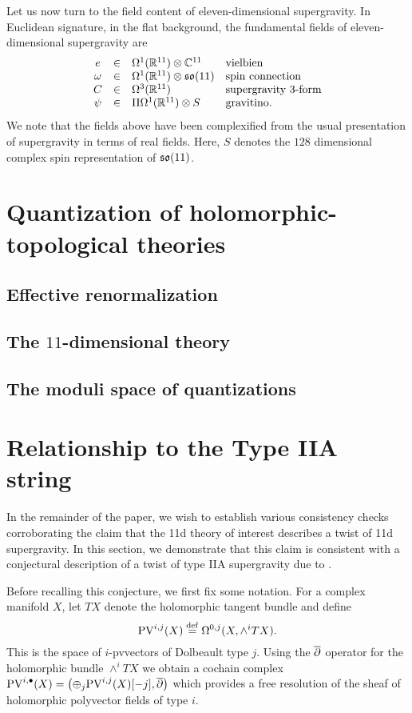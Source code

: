 \documentclass[11pt]{amsart}
\def\pv{{\rm PV}}
\begin{document}
Let us now turn to the field content of eleven-dimensional supergravity.
In Euclidean signature, in the flat background, the fundamental fields of eleven-dimensional supergravity are
\[
  \begin{array}{ccll}
    e & \in & \Omega^1(\mathbb R^{11}) \otimes \mathbb C^{11} & \mbox{vielbien} \\
    \omega & \in & \Omega^1(\mathbb R^{11}) \otimes \mathfrak s \mathfrak o(11) & \mbox{spin connection} \\
    C & \in & \Omega^3(\mathbb R^{11}) & \mbox{supergravity $3$-form} \\
    \psi & \in & \Pi \Omega^1(\mathbb R^{11}) \otimes S & \mbox{gravitino} .
  \end{array}
\]
We note that the fields above have been complexified from the usual presentation of supergravity in terms of real fields.
Here, $S$ denotes the $128$ dimensional complex spin representation of $\mathfrak s \mathfrak o(11)$.

\section{Quantization of holomorphic-topological theories}
\label{sec:org297a559}
\subsection{Effective renormalization}
\label{sec:orga5cd4ed}
\subsection{The \(11\)-dimensional theory}
\label{sec:org8b189fc}
\subsection{The moduli space of quantizations}
\label{sec:orgf278b4e}
\section{Relationship to the Type IIA string}
\label{sec:org355a726}
In the remainder of the paper, we wish to establish various consistency checks corroborating the claim that the 11d theory of interest describes a twist of 11d supergravity. In this section, we demonstrate that this claim is consistent with a conjectural description of a twist of type IIA supergravity due to \cite{}.

Before recalling this conjecture, we first fix some notation. For a complex manifold $X$, let $TX$ denote the holomorphic tangent bundle and define
\[
\pv^{i,j}(X) \define \Omega^{0,j}(X, \wedge^{i} TX) .\]
This is the space of $i$-pvvectors of Dolbeault type $j$.
Using the $\overline{\partial}$ operator for the holomorphic bundle $\wedge^{i}TX$ we obtain a cochain complex $\pv^{i,\bu}(X) = \left(\oplus_{j} \pv^{i,j}(X) [-j], \dbar \right)$ which provides a free resolution of the sheaf of holomorphic polyvector fields of type $i$.
\end{document}
